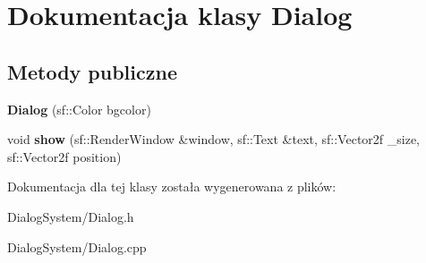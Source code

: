 \hypertarget{class_dialog}{\section{Dokumentacja klasy Dialog}
\label{class_dialog}
}
\subsection*{Metody publiczne}
\begin{DoxyCompactItemize}
\item 
\hypertarget{class_dialog_a09bd324cf3edb083b78f8c5924a7da57}{{\bfseries Dialog} (sf\-::\-Color bgcolor)}\label{class_dialog_a09bd324cf3edb083b78f8c5924a7da57}

\item 
\hypertarget{class_dialog_accb9135a31533d3a7ce9f4555e5035a2}{void {\bfseries show} (sf\-::\-Render\-Window \&window, sf\-::\-Text \&text, sf\-::\-Vector2f \-\_\-size, sf\-::\-Vector2f position)}\label{class_dialog_accb9135a31533d3a7ce9f4555e5035a2}

\end{DoxyCompactItemize}


Dokumentacja dla tej klasy została wygenerowana z plików\-:\begin{DoxyCompactItemize}
\item 
Dialog\-System/Dialog.\-h\item 
Dialog\-System/Dialog.\-cpp\end{DoxyCompactItemize}
